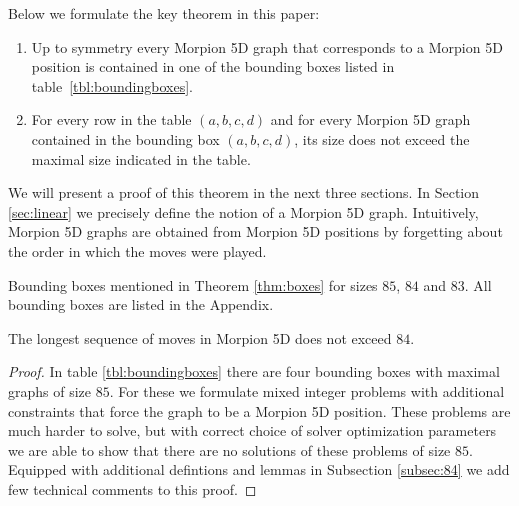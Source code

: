   
Below we formulate the key theorem in this paper: %
\begin{theorem}
\begin{enumerate}
\item Up to symmetry every Morpion 5D graph that corresponds to a Morpion 5D position
    is contained in one of the bounding boxes listed in table~\ref{tbl:boundingboxes}.
\item For every row in the table $(a,b,c,d)$ and for every Morpion 5D graph contained in the bounding box  $(a,b,c,d)$,
its size does not exceed the maximal size indicated in the table.
\end{enumerate} 
\label{thm:boxes}
\end{theorem}
We will present a proof of this theorem in the next three sections. 
In Section \ref{sec:linear} we precisely define the notion of a Morpion 5D graph. Intuitively, Morpion 5D graphs are obtained from Morpion 5D positions by forgetting about the order in which the moves were played.

\begin{table}[ht]
\centering
 

\caption{Bounding boxes mentioned in Theorem \ref{thm:boxes} for sizes $85$, $84$ and $83$. All bounding boxes are listed in the Appendix. }
\label{tbl:boundingboxes}
\end{table}




\begin{corollary}
\label{cor:84}
The longest sequence of moves in Morpion 5D does not exceed $84$.
\end{corollary}
\begin{proof} 
In table \ref{tbl:boundingboxes} there are four bounding boxes with maximal graphs of size $85$. 
For these we formulate mixed integer problems with additional constraints that force the graph to
  be a Morpion 5D position.
These problems are much harder to solve, but with correct choice of solver optimization parameters we are able to show
  that there are no solutions of these problems of size $85$. Equipped with additional defintions and lemmas in Subsection \ref{subsec:84} we add few technical 
comments to this proof. 
\end{proof}




